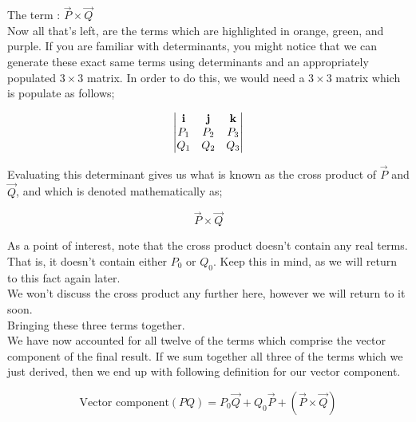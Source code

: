 \textbullet \; The term : \(\vec{P} \times \vec{Q}\) \\

Now all that's left, are the terms which are highlighted in orange, green, and purple. If you are familiar with
determinants, you might notice that we can generate these exact same terms using determinants and an appropriately
populated \(3 \times 3\) matrix. In order to do this, we would need a \(3 \times 3\) matrix which is populate as
follows;

\begin{equation*}
    \begin{vmatrix}
        \bm{\mathrm{i}} & \bm{\mathrm{j}} & \bm{\mathrm{k}} \\
        P_1      & P_2      & P_3      \\
        Q_1      & Q_2      & Q_3
    \end{vmatrix}
\end{equation*}
\vspace{0.0\baselineskip}

Evaluating this determinant gives us what is known as the cross product of \(\vec{P}\) and \(\vec{Q}\), and which is
denoted mathematically as;

\begin{equation*}
    \vec{P} \times \vec{Q}
\end{equation*}
\vspace{0.0\baselineskip}

As a point of interest, note that the cross product doesn't contain any real terms. That is, it doesn't contain either
\(P_0\) or \(Q_0\). Keep this in mind, as we will return to this fact again later. \\

We won't discuss the cross product any further here, however we will return to it soon. \\

\textbullet \; Bringing these three terms together. \\

We have now accounted for all twelve of the terms which comprise the vector component of the final result. If we sum
together all three of the terms which we just derived, then we end up with following definition for our vector component.

\begin{equation*}
    \text{Vector component}(PQ) = P_0\vec{Q} + Q_0\vec{P} + (\vec{P}\times\vec{Q})
\end{equation*}

